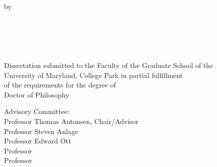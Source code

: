 
\clearpage{}
{}

\thispagestyle{empty}
\hbox{\ }
\vspace{1in}
\renewcommand{\baselinestretch}{1}
\small\normalsize
\begin{center}

\large{{\dissertationtitle}}\\
\ \\
\ \\
\large{by} \\
\ \\%
\large{\myfullname}
\ \\
\ \\
\ \\
\ \\
\normalsize
Dissertation submitted to the Faculty of the Graduate School of the \\
University of Maryland, College Park in partial fulfillment \\
of the requirements for the degree of \\
Doctor of Philosophy \\
\gradyear
\end{center}

\vspace{7.5em}

\noindent Advisory Committee: \\
Professor Thomas Antonsen, Chair/Advisor \\
Professor Steven Anlage\\
Professor Edward Ott\\
Professor \\
Professor \\

